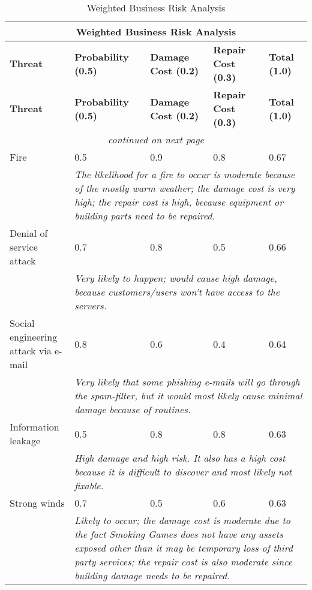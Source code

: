 \begin{longtable}{| p{4.2cm} | p{1.8cm} | p{1.8cm} | p{1.8cm} | p{1.8cm} |}
		\caption{Weighted Business Risk Analysis}\label{ref:tabWBRA}\\
		\hline \multicolumn{5}{|c|}{\textbf{Weighted Business Risk Analysis}}\\\hline
		\textbf{Threat} & \textbf{Probability (0.5)} & \textbf{Damage Cost (0.2)} & \textbf{Repair Cost (0.3)} & \textbf{Total (1.0)}\\\hline
		\endfirsthead
		\textbf{Threat} & \textbf{Probability (0.5)} & \textbf{Damage Cost (0.2)} & \textbf{Repair Cost (0.3)} & \textbf{Total (1.0)}\\\hline
		\endhead
		\multicolumn{5}{|c|}{\textit{continued on next page}}\\
		\endfoot
		\endlastfoot
		Fire & 0.5 & 0.9 & 0.8 & 0.67\\\hline
		& \multicolumn{4}{|p{8cm}|}{\textit{The likelihood for a fire to occur is moderate because of the mostly warm weather; the damage cost is very high; the repair cost is high, because equipment or building parts need to be repaired.}}\\\hline
		Denial of service attack & 0.7 & 0.8 & 0.5 & 0.66\\\hline
		& \multicolumn{4}{|p{8cm}|}{\textit{Very likely to happen; would cause high damage, because customers/users won't have access to the servers.}}\\\hline
		Social engineering attack via e-mail & 0.8 & 0.6 & 0.4 & 0.64\\\hline
		& \multicolumn{4}{|p{8cm}|}{\textit{Very likely that some phishing e-mails will go through the spam-filter, but it would most likely cause minimal damage because of routines.}}\\\hline
		Information leakage & 0.5 & 0.8 & 0.8 & 0.63\\\hline
		& \multicolumn{4}{|p{8cm}|}{\textit{High damage and high risk. It also has a high cost because it is difficult to discover and most likely not fixable.}}\\\hline
		Strong winds & 0.7 & 0.5 & 0.6 & 0.63\\\hline
		& \multicolumn{4}{|p{8cm}|}{\textit{Likely to occur; the damage cost is moderate due to the fact Smoking Games does not have any assets exposed other than it may be temporary loss of third party services; the repair cost is also moderate since building damage needs to be repaired.}}\\\hline

\end{longtable}
